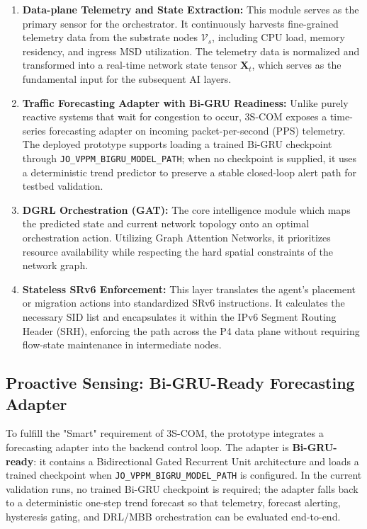 \documentclass[12pt, a4paper, reqno, oneside]{book}
\begin{document}
\begin{enumerate}
    \item \textbf{Data-plane Telemetry and State Extraction:} This module serves as the primary sensor for the orchestrator. It continuously harvests fine-grained telemetry data from the substrate nodes $\mathcal{V}_s$, including CPU load, memory residency, and ingress MSD utilization. The telemetry data is normalized and transformed into a real-time network state tensor $\mathbf{X}_t$, which serves as the fundamental input for the subsequent AI layers.
    \item \textbf{Traffic Forecasting Adapter with Bi-GRU Readiness:} Unlike purely reactive systems that wait for congestion to occur, 3S-COM exposes a time-series forecasting adapter on incoming packet-per-second (PPS) telemetry. The deployed prototype supports loading a trained Bi-GRU checkpoint through \texttt{JO\_VPPM\_BIGRU\_MODEL\_PATH}; when no checkpoint is supplied, it uses a deterministic trend predictor to preserve a stable closed-loop alert path for testbed validation.
    \item \textbf{DGRL Orchestration (GAT):} The core intelligence module which maps the predicted state and current network topology onto an optimal orchestration action. Utilizing Graph Attention Networks, it prioritizes resource availability while respecting the hard spatial constraints of the network graph.
    \item \textbf{Stateless SRv6 Enforcement:} This layer translates the agent's placement or migration actions into standardized SRv6 instructions. It calculates the necessary SID list and encapsulates it within the IPv6 Segment Routing Header (SRH), enforcing the path across the P4 data plane without requiring flow-state maintenance in intermediate nodes.
\end{enumerate}

\subsection{Proactive Sensing: Bi-GRU-Ready Forecasting Adapter}
To fulfill the "Smart" requirement of 3S-COM, the prototype integrates a forecasting adapter into the backend control loop. The adapter is \textbf{Bi-GRU-ready}: it contains a Bidirectional Gated Recurrent Unit architecture and loads a trained checkpoint when \texttt{JO\_VPPM\_BIGRU\_MODEL\_PATH} is configured. In the current validation runs, no trained Bi-GRU checkpoint is required; the adapter falls back to a deterministic one-step trend forecast so that telemetry, forecast alerting, hysteresis gating, and DRL/MBB orchestration can be evaluated end-to-end.
\end{document}
